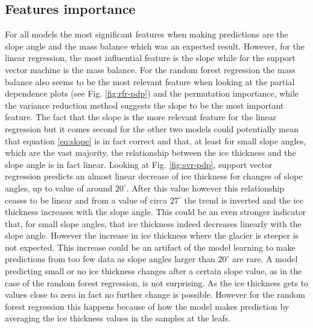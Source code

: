 \subsection{Features importance}\label{disc-features}
For all models the most significant features when making predictions are the slope angle and the mass balance which was an expected result. However, for the linear regression, the most influential feature is the slope while for the support  vector machine is the mass balance. For the random forest regression the mass balance also seems to be the most relevant feature when looking at the partial dependence plots (see Fig. \ref{fig:rfr-pdp}) and the permutation importance, while the variance reduction method suggests the slope to be the most important feature. The fact that the slope is the more relevant feature for the linear regression but it comes second for the other two models could potentially mean that equation \ref{eq:slope} is in fact correct and that, at least for small slope angles, which are the vast majority, the relationship between the ice thickness and the slope angle is in fact linear. Looking at Fig. \ref{fig:svr-pdp}, support vector regression predicts an almost linear decrease of ice thickness for changes of slope angles, up to value of around $20^{\circ}$. After this value however this relationship ceases to be linear and from a value of circa $27^{\circ}$ the trend is inverted and the ice thickness increases with the slope angle. This could be an even stronger indicator that, for small slope angles, that ice thickness indeed decreases linearly with the slope angle. However the increase in ice thickness where the glacier is steeper is not expected. This increase could be an artifact of the model learning to make predictions from too few data as slope angles larger than $20^{\circ}$ are rare. A model predicting small or no ice thickness changes after a certain slope value, as in the case of the random forest regression, is not surprising. As the ice thickness gets to values close to zero in fact no further change is possible. However for the random forest regression this happens because of how the model makes prediction by averaging the ice thickness values in the samples at the leafs.

